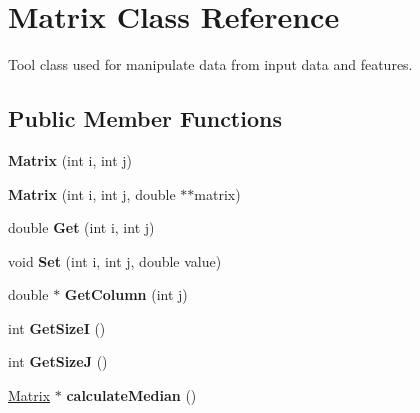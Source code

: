 \hypertarget{classMatrix}{}\section{Matrix Class Reference}
\label{classMatrix}


Tool class used for manipulate data from input data and features.  


\subsection*{Public Member Functions}
\begin{DoxyCompactItemize}
\item 
\hypertarget{classMatrix_af69aee84af5e2c1851eabd46ec65fc59}{}{\bfseries Matrix} (int i, int j)\label{classMatrix_af69aee84af5e2c1851eabd46ec65fc59}

\item 
\hypertarget{classMatrix_a3ce72ec14cb358b23ea14549b8816e4a}{}{\bfseries Matrix} (int i, int j, double $\ast$$\ast$matrix)\label{classMatrix_a3ce72ec14cb358b23ea14549b8816e4a}

\item 
\hypertarget{classMatrix_a353d02e26bafa481d00e866e39e21a41}{}double {\bfseries Get} (int i, int j)\label{classMatrix_a353d02e26bafa481d00e866e39e21a41}

\item 
\hypertarget{classMatrix_a4258bd5497e81af8ea908338dbe83664}{}void {\bfseries Set} (int i, int j, double value)\label{classMatrix_a4258bd5497e81af8ea908338dbe83664}

\item 
\hypertarget{classMatrix_a31f81a2b114be86717ce1aa91bc10cfd}{}double $\ast$ {\bfseries Get\+Column} (int j)\label{classMatrix_a31f81a2b114be86717ce1aa91bc10cfd}

\item 
\hypertarget{classMatrix_afceacf07aff7ed4c3b9ae9dc761e7135}{}int {\bfseries Get\+Size\+I} ()\label{classMatrix_afceacf07aff7ed4c3b9ae9dc761e7135}

\item 
\hypertarget{classMatrix_a642b9a4e1c982ac40477dd8c8b1eae10}{}int {\bfseries Get\+Size\+J} ()\label{classMatrix_a642b9a4e1c982ac40477dd8c8b1eae10}

\item 
\hypertarget{classMatrix_ab97e4bd28c3a93277702a6d21212ecbb}{}\hyperlink{classMatrix}{Matrix} $\ast$ {\bfseries calculate\+Median} ()\label{classMatrix_ab97e4bd28c3a93277702a6d21212ecbb}

\end{DoxyCompactItemize}

